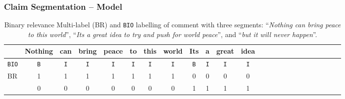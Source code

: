 \documentclass{beamer}
\begin{document}
\begin{frame}
\frametitle{Claim Segmentation -- Model}

\begin{table}
\scriptsize
\begin{tabular}{l | ccccccc cccccccc ccc ccccc}

	& Nothing& can& bring& peace& to& this& world 
&Its& a& great& idea 

\\
	\midrule
	\texttt{BIO} & \texttt{B} & \texttt{I} & \texttt{I} &
	\texttt{I} & \texttt{I} & \texttt{I} & \texttt{I} & \texttt{B}&
	\texttt{I} & \texttt{I} & \texttt{I} 
	\\
	\midrule
	\multirow{3}{*}{BR} & 1 & 1 & 1 & 1 & 1 & 1 & 1 
	& 0& 0 & 0 & 0 
	\\

	& 0 & 0 & 0 & 0 & 0 & 0 & 0 
	& 1& 1 & 1 & 1 

	\\

\end{tabular}
	\caption{Binary relevance Multi-label (BR) and \texttt{BIO} labelling
	of comment with three segments: 
	``\textit{Nothing can bring peace to this world}'', 
	``\textit{Its a great idea to try and push for world peace}'', and
	``\textit{but it will never happen}''. 
}
\end{table}

\end{frame}
\end{document}
